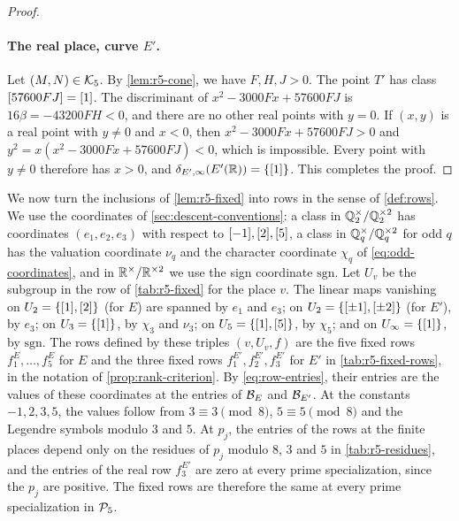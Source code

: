 \begin{proof}
\paragraph{The real place, curve $E'$.} Let $(M,N)\in\mathcal K_5$. By \cref{lem:r5-cone}, we have $F,H,J>0$. The point $T'$ has class $[57600FJ]=[1]$. The discriminant of $x^2-3000Fx+57600FJ$ is $16\beta=-43200FH<0$, and there are no other real points with $y=0$. If $(x,y)$ is a real point with $y\ne0$ and $x<0$, then $x^2-3000Fx+57600FJ>0$ and $y^2=x(x^2-3000Fx+57600FJ)<0$, which is impossible. Every point with $y\ne0$ therefore has $x>0$, and $\delta_{E',\infty}(E'(\mathbb R))=\{[1]\}$. This completes the proof.
\end{proof}

We now turn the inclusions of \cref{lem:r5-fixed} into rows in the sense of \cref{def:rows}. We use the coordinates of \cref{sec:descent-conventions}: a class in $\mathbb Q_2^{\times}/\mathbb Q_2^{\times2}$ has coordinates $(e_1,e_2,e_3)$ with respect to $[-1],[2],[5]$, a class in $\mathbb Q_q^{\times}/\mathbb Q_q^{\times2}$ for odd $q$ has the valuation coordinate $\nu_q$ and the character coordinate $\chi_q$ of \eqref{eq:odd-coordinates}, and in $\mathbb R^{\times}/\mathbb R^{\times2}$ we use the sign coordinate $\mathrm{sgn}$. Let $U_v$ be the subgroup in the row of \cref{tab:r5-fixed} for the place $v$. The linear maps vanishing on $U_2=\{[1],[2]\}$ (for $E$) are spanned by $e_1$ and $e_3$; on $U_2=\{[\pm1],[\pm2]\}$ (for $E'$), by $e_3$; on $U_3=\{[1]\}$, by $\chi_3$ and $\nu_3$; on $U_5=\{[1],[5]\}$, by $\chi_5$; and on $U_\infty=\{[1]\}$, by $\mathrm{sgn}$. The rows defined by these triples $(v,U_v,f)$ are the five fixed rows $f^E_1,\dots,f^E_5$ for $E$ and the three fixed rows $f^{E'}_1,f^{E'}_2,f^{E'}_3$ for $E'$ in \cref{tab:r5-fixed-rows}, in the notation of \cref{prop:rank-criterion}. By \eqref{eq:row-entries}, their entries are the values of these coordinates at the entries of $\mathcal B_E$ and $\mathcal B_{E'}$. At the constants $-1,2,3,5$, the values follow from $3\equiv3\pmod8$, $5\equiv5\pmod8$ and the Legendre symbols modulo $3$ and $5$. At $p_j$, the entries of the rows at the finite places depend only on the residues of $p_j$ modulo $8$, $3$ and $5$ in \cref{tab:r5-residues}, and the entries of the real row $f^{E'}_3$ are zero at every prime specialization, since the $p_j$ are positive. The fixed rows are therefore the same at every prime specialization in $\mathcal P_5$.

